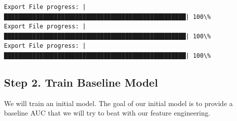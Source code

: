 \documentclass[11pt]{article}
\begin{document}
    \begin{Verbatim}[commandchars=\\\{\}]
Export File progress: |███████████████████████████████████████████████████| 100\%
Export File progress: |███████████████████████████████████████████████████| 100\%
Export File progress: |███████████████████████████████████████████████████| 100\%

    \end{Verbatim}

    \subsection{Step 2. Train Baseline
Model}\label{step-2.-train-baseline-model}

We will train an initial model. The goal of our initial model is to
provide a baseline AUC that we will try to beat with our feature
engineering.
\end{document}
